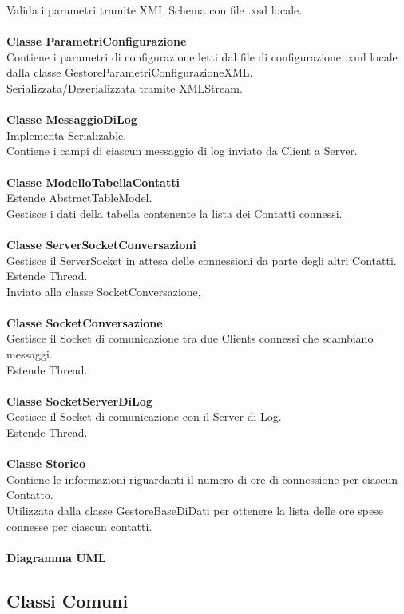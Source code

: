 \documentclass[a4paper, 11pt]{article} %
\begin{document}
Valida i parametri tramite XML Schema con file .xsd locale.\\
\\
\textbf{Classe ParametriConfigurazione}\\
Contiene i parametri di configurazione letti dal file di configurazione .xml locale dalla classe GestoreParametriConfigurazioneXML.\\
Serializzata/Deserializzata tramite XMLStream.\\
\\
\textbf{Classe MessaggioDiLog}\\
Implementa Serializable.\\
Contiene i campi di ciascun messaggio di log inviato da Client a Server.\\
\\
\textbf{Classe ModelloTabellaContatti}\\
Estende AbstractTableModel.\\
Gestisce i dati della tabella contenente la lista dei Contatti connessi.\\
\\
\textbf{Classe ServerSocketConversazioni}\\
Gestisce il ServerSocket in attesa delle connessioni da parte degli altri Contatti.\\
Estende Thread.\\
Inviato alla classe SocketConversazione,\\
\\
\textbf{Classe SocketConversazione}\\
Gestisce il Socket di comunicazione tra due Clients connessi che scambiano messaggi.\\
Estende Thread.\\
\\
\textbf{Classe SocketServerDiLog}\\
Gestisce il Socket di comunicazione con il Server di Log.\\
Estende Thread.\\
\\
\textbf{Classe Storico}\\
Contiene le informazioni riguardanti il numero di ore di connessione per ciascun Contatto.\\
Utilizzata dalla classe GestoreBaseDiDati per ottenere la lista delle ore spese connesse per ciascun contatti.\\
\\
\textbf{Diagramma UML}

\subsection{Classi Comuni}
\end{document}
